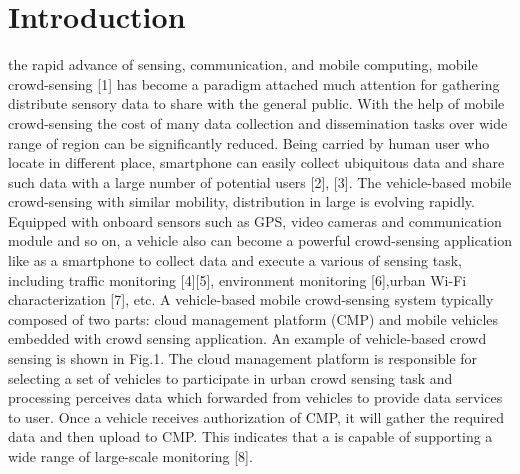 \documentclass[journal]{IEEEtran}
\begin{document}
%
\IEEEpeerreviewmaketitle



\section{Introduction}

% 
% 
% 
% 
 the rapid advance of sensing, communication, and mobile computing, mobile crowd-sensing [1] has become a paradigm attached much attention for gathering distribute sensory data to share with the general public. With the help of mobile crowd-sensing the cost of many data collection and dissemination tasks over wide range of region can be significantly reduced. Being carried by human user who locate in different place, smartphone can easily collect ubiquitous data and share such data with a large number of potential users [2], [3]. The vehicle-based mobile crowd-sensing with similar mobility, distribution in large is evolving rapidly. Equipped with onboard sensors such as GPS, video cameras and communication module and so on, a vehicle also can become a powerful crowd-sensing application like as a smartphone to collect data and execute a various of sensing task, including traffic monitoring [4][5], environment monitoring [6],urban Wi-Fi characterization [7], etc. 
A vehicle-based mobile crowd-sensing system typically composed of two parts: cloud management platform (CMP) and mobile vehicles embedded with crowd sensing application. An example of vehicle-based crowd sensing is shown in Fig.1. The cloud management platform is responsible for selecting a set of vehicles to participate in urban crowd sensing task and processing perceives data which forwarded from vehicles to provide data services to user. Once a vehicle receives authorization of CMP, it will gather the required data and then upload to CMP. This indicates that a is capable of supporting a wide range of large-scale monitoring [8].
\end{document}

